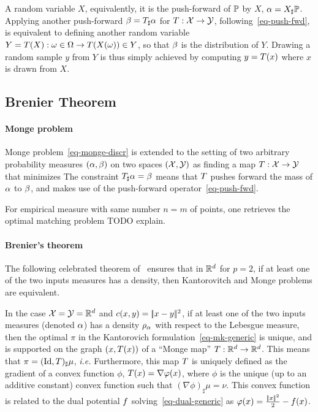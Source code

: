 A random variable $X$, equivalently, it is the push-forward of $\mathbb{P}$ by $X$, $\alpha=X_\sharp\mathbb{P}$.
%
Applying another push-forward $\beta = T_\sharp\alpha$ for $T : \mathcal{X} \rightarrow \mathcal{Y}$, following~\eqref{eq-push-fwd}, is equivalent to defining another random variable $Y=T(X) : \omega \in \Omega \rightarrow T(X(\omega)) \in Y$, so that $\beta$ is the distribution of $Y$.
%
Drawing a random sample $y$ from $Y$ is thus simply achieved by computing $y=T(x)$ where $x$ is drawn from $X$. 



\subsection{Brenier Theorem}


\paragraph{Monge problem}

Monge problem~\eqref{eq-monge-discr} is extended to the setting of two arbitrary probability measures $(\alpha,\beta)$ on two spaces $(\mathcal{X},\mathcal{Y})$ as finding a map $T : \mathcal{X} \rightarrow \mathcal{Y}$ that minimizes
The constraint $T_\sharp \alpha = \beta$ means that $T$ pushes forward the mass of $\alpha$ to $\beta$, and makes use of the push-forward operator~\eqref{eq-push-fwd}. 

For empirical measure with same number $n=m$ of points, one retrieves the optimal matching problem TODO explain.   
  


\paragraph{Brenier's theorem}

The following celebrated theorem of~\cite{Brenier91} ensures that in $\mathbb{R}^d$ for $p=2$, if at least one of the two inputs measures has a density, then Kantorovitch and Monge problems are equivalent.

\begin{thm}[Brenier]
	In the case $\mathcal{X}=\mathcal{Y}=\mathbb{R}^d$ and $c(x,y)=|\!| x-y |\!|^2$, if at least one of the two inputs measures (denoted $\alpha$) has a density $\rho_{\alpha}$ with respect to the Lebesgue measure, then the optimal $\pi$ in the Kantorovich formulation~\eqref{eq-mk-generic} is unique, and is supported on the graph $(x,T(x))$ of a ``Monge map'' $T : \mathbb{R}^d \rightarrow \mathbb{R}^d$. This means that $\pi = (\mathrm{Id},T)_{\sharp} \mu$, \emph{i.e.} 
Furthermore, this map $T$ is uniquely defined as the gradient of a convex function $\phi$, $T(x) = \nabla\varphi(x)$, where $\phi$ is the unique (up to an additive constant) convex function such that $(\nabla\phi)_\sharp \mu=\nu$. This convex function is related to the dual potential $f$ solving~\eqref{eq-dual-generic} as $\varphi(x)=\frac{|\!| x |\!|^2}{2}-f(x)$.
\end{thm}


